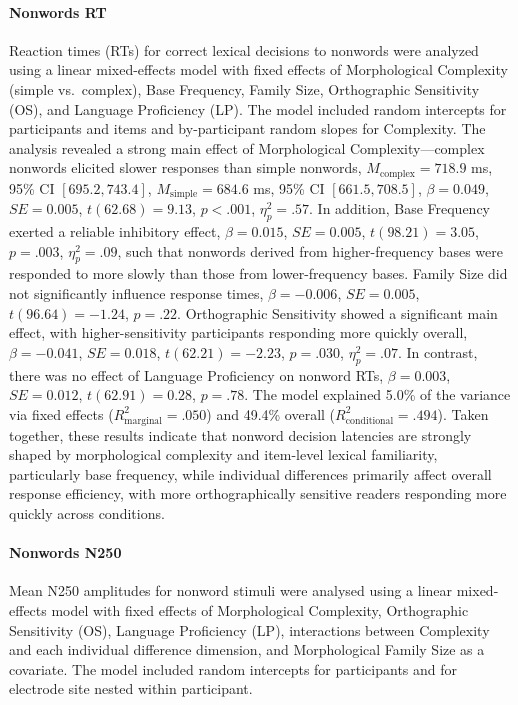 \documentclass[utf8]{FrontiersinHarvard} %
\begin{document}
	\paragraph*{Nonwords RT}
	Reaction times (RTs) for correct lexical decisions to nonwords were analyzed using a linear mixed-effects model with fixed effects of Morphological Complexity (simple vs.\ complex), Base Frequency, Family Size, Orthographic Sensitivity (OS), and Language Proficiency (LP). The model included random intercepts for participants and items and by-participant random slopes for Complexity. The analysis revealed a strong main effect of Morphological Complexity—complex nonwords elicited slower responses than simple nonwords, $M_{\mathrm{complex}} = 718.9$ ms, 95\% CI $[695.2, 743.4]$, $M_{\mathrm{simple}} = 684.6$ ms, 95\% CI $[661.5, 708.5]$, $\beta = 0.049$, $SE = 0.005$, $t(62.68) = 9.13$, $p < .001$, $\eta^2_p = .57$. In addition, Base Frequency exerted a reliable inhibitory effect, $\beta = 0.015$, $SE = 0.005$, $t(98.21) = 3.05$, $p = .003$, $\eta^2_p = .09$, such that nonwords derived from higher-frequency bases were responded to more slowly than those from lower-frequency bases. Family Size did not significantly influence response times, $\beta = -0.006$, $SE = 0.005$, $t(96.64) = -1.24$, $p = .22$. Orthographic Sensitivity showed a significant main effect, with higher-sensitivity participants responding more quickly overall, $\beta = -0.041$, $SE = 0.018$, $t(62.21) = -2.23$, $p = .030$, $\eta^2_p = .07$. In contrast, there was no effect of Language Proficiency on nonword RTs, $\beta = 0.003$, $SE = 0.012$, $t(62.91) = 0.28$, $p = .78$. The model explained 5.0\% of the variance via fixed effects ($R^2_{\mathrm{marginal}} = .050$) and 49.4\% overall ($R^2_{\mathrm{conditional}} = .494$). Taken together, these results indicate that nonword decision latencies are strongly shaped by morphological complexity and item-level lexical familiarity, particularly base frequency, while individual differences primarily affect overall response efficiency, with more orthographically sensitive readers responding more quickly across conditions.
	
	
	\paragraph*{Nonwords N250}
	
	Mean N250 amplitudes for nonword stimuli were analysed using a linear mixed-effects model with fixed effects of Morphological Complexity, Orthographic Sensitivity (OS), Language Proficiency (LP), interactions between Complexity and each individual difference dimension, and Morphological Family Size as a covariate. The model included random intercepts for participants and for electrode site nested within participant.
	
\end{document}
